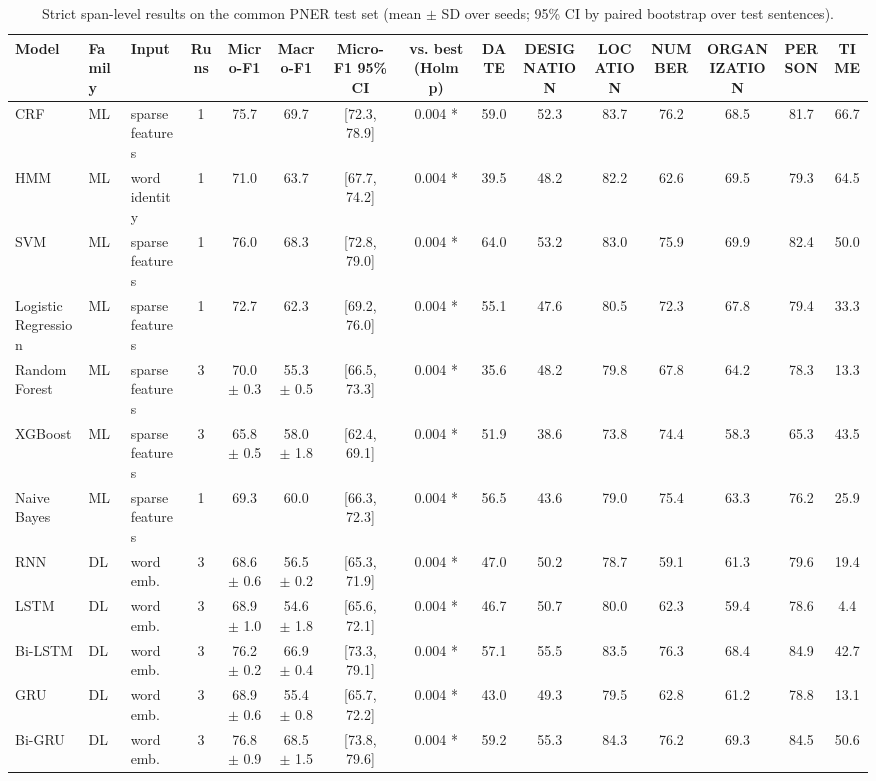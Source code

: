 \begin{table}[t]
\centering
\small
\caption{Strict span-level results on the common PNER test set (mean $\pm$ SD over seeds; 95\% CI by paired bootstrap over test sentences).}
\label{tab:main}
\begin{tabular}{lllcccccccccccc}
\hline
Model & Family & Input & Runs & Micro-F1 & Macro-F1 & Micro-F1 95\% CI & vs. best (Holm p) & DATE & DESIGNATION & LOCATION & NUMBER & ORGANIZATION & PERSON & TIME \\
\hline
CRF & ML & sparse features & 1 & 75.7 & 69.7 & [72.3, 78.9] & 0.004 * & 59.0 & 52.3 & 83.7 & 76.2 & 68.5 & 81.7 & 66.7 \\
HMM & ML & word identity & 1 & 71.0 & 63.7 & [67.7, 74.2] & 0.004 * & 39.5 & 48.2 & 82.2 & 62.6 & 69.5 & 79.3 & 64.5 \\
SVM & ML & sparse features & 1 & 76.0 & 68.3 & [72.8, 79.0] & 0.004 * & 64.0 & 53.2 & 83.0 & 75.9 & 69.9 & 82.4 & 50.0 \\
Logistic Regression & ML & sparse features & 1 & 72.7 & 62.3 & [69.2, 76.0] & 0.004 * & 55.1 & 47.6 & 80.5 & 72.3 & 67.8 & 79.4 & 33.3 \\
Random Forest & ML & sparse features & 3 & 70.0 $\pm$ 0.3 & 55.3 $\pm$ 0.5 & [66.5, 73.3] & 0.004 * & 35.6 & 48.2 & 79.8 & 67.8 & 64.2 & 78.3 & 13.3 \\
XGBoost & ML & sparse features & 3 & 65.8 $\pm$ 0.5 & 58.0 $\pm$ 1.8 & [62.4, 69.1] & 0.004 * & 51.9 & 38.6 & 73.8 & 74.4 & 58.3 & 65.3 & 43.5 \\
Naive Bayes & ML & sparse features & 1 & 69.3 & 60.0 & [66.3, 72.3] & 0.004 * & 56.5 & 43.6 & 79.0 & 75.4 & 63.3 & 76.2 & 25.9 \\
\hline
RNN & DL & word emb. & 3 & 68.6 $\pm$ 0.6 & 56.5 $\pm$ 0.2 & [65.3, 71.9] & 0.004 * & 47.0 & 50.2 & 78.7 & 59.1 & 61.3 & 79.6 & 19.4 \\
LSTM & DL & word emb. & 3 & 68.9 $\pm$ 1.0 & 54.6 $\pm$ 1.8 & [65.6, 72.1] & 0.004 * & 46.7 & 50.7 & 80.0 & 62.3 & 59.4 & 78.6 & 4.4 \\
Bi-LSTM & DL & word emb. & 3 & 76.2 $\pm$ 0.2 & 66.9 $\pm$ 0.4 & [73.3, 79.1] & 0.004 * & 57.1 & 55.5 & 83.5 & 76.3 & 68.4 & 84.9 & 42.7 \\
GRU & DL & word emb. & 3 & 68.9 $\pm$ 0.6 & 55.4 $\pm$ 0.8 & [65.7, 72.2] & 0.004 * & 43.0 & 49.3 & 79.5 & 62.8 & 61.2 & 78.8 & 13.1 \\
Bi-GRU & DL & word emb. & 3 & 76.8 $\pm$ 0.9 & 68.5 $\pm$ 1.5 & [73.8, 79.6] & 0.004 * & 59.2 & 55.3 & 84.3 & 76.2 & 69.3 & 84.5 & 50.6 \\

\end{tabular}
\end{table}
